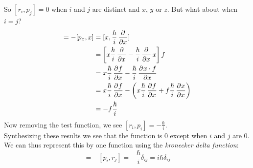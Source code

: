 \documentclass{scrartcl}
\begin{document}
So $[r_i,p_j]=0$ when $i$ and $j$ are distinct and $x$, $y$ or $z$. But what about when $i=j$?
\begin{align*}
[x,p_x]=-[p_x,x]&=[x,\frac{\hbar}{i} \dpd{}{x}]\\
&=\left[x\frac{\hbar}{i} \dpd{}{x} - \frac{\hbar}{i} \dpd{}{x}x\right]f\\
&=x\frac{\hbar}{i} \dpd{f}{x}-\frac{\hbar}{i} \dpd{x\cdot f}{x}\\
&=x\frac{\hbar}{i} \dpd{f}{x}-\left(x\frac{\hbar}{i} \dpd{f}{x} + f\frac{\hbar}{i} \dpd{x}{x}\right)\\
&=-f\frac{\hbar}{i}
\end{align*} 
Now removing the test function, we see $[r_i,p_i]=-\frac{\hbar}{i}$.\\
Synthesizing these results we see that the function is 0 except when $i$ and $j$ are 0. We can thus represent this by one function using the \emph{kronecker delta function}:
\begin{displaymath}
[r_i,p_j]=-[p_i,r_j]=-\frac{\hbar}{i}\delta_{ij}=i\hbar\delta_{ij}
\end{displaymath}\\
\end{document}
